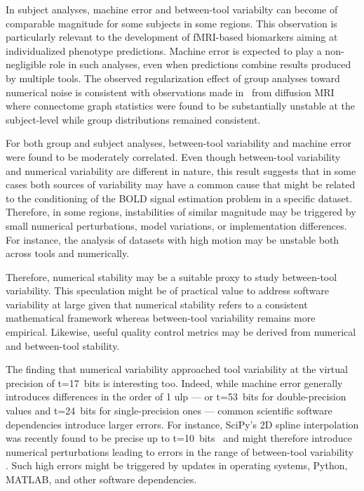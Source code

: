\documentclass[11pt,onecolumn]{article}
\begin{document}
In subject analyses, machine error and between-tool variabilty can become
of comparable magnitude for some subjects in some regions. This observation
is particularly relevant to the development of fMRI-based biomarkers aiming
at individualized phenotype predictions. Machine error is expected to play
a non-negligible role in such analyses, even when predictions combine
results produced by multiple tools. The observed regularization effect of
group analyses toward numerical noise is consistent with observations made
in~\cite{kiar2020numerical} from diffusion MRI where connectome graph
statistics were found to be substantially unstable at the subject-level
while group distributions remained consistent. 

For both group and subject analyses, between-tool variability and machine
error were found to be moderately correlated. Even though between-tool
variability and numerical variability are different in nature, this result
suggests that in some cases both sources of variability may have a common
cause that might be related to the conditioning of the BOLD signal
estimation problem in a specific dataset. Therefore, in some regions,
instabilities of similar magnitude may be triggered by small numerical
perturbations, model variations, or implementation differences. For
instance, the analysis of datasets with high motion may be unstable both 
across tools and numerically. 

Therefore, numerical stability may be a suitable proxy to study
between-tool variability. This speculation might be of practical value to
address software variability at large given that numerical stability refers
to a consistent mathematical framework whereas between-tool variability
remains more empirical. Likewise, useful quality control metrics may be derived from numerical and between-tool stability.

The finding that numerical variability approached tool variability at the
virtual precision of t=17~bits is interesting too. Indeed, while machine
error generally introduces differences in the order of 1 ulp --- or
t=53~bits for double-precision values and t=24~bits for single-precision
ones --- common scientific software dependencies introduce larger errors.
For instance, SciPy's 2D spline interpolation was recently found to be
precise up to t=10~bits~\cite{pytracer}  and might therefore introduce
numerical perturbations leading to errors in the range of between-tool
variability . Such high errors
might be triggered by updates in operating systems, Python, MATLAB, and
other software dependencies.
\end{document}
